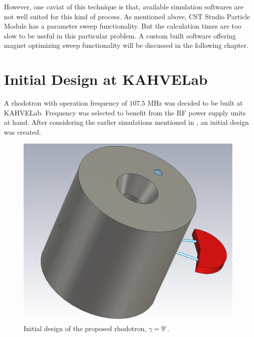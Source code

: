 \documentclass[a4paper,oneside,12pt]{report}
\numberwithin{equation}{chapter}
\begin{document}
However, one caviat of this technique is that, available simulation softwares are not well suited for this kind of process. As mentioned above, CST Studio Particle Module has a parameter sweep functionality.
But the calculation times are too slow to be useful in this particular problem. A custom built software offering magnet optimizing sweep functionality will be discussed in the following chapter.




\section{Initial Design at KAHVELab} 

A rhodotron with operation frequency of $107.5$ MHz was decided to be built at KAHVELab. 
Frequency was selected to benefit from the RF power supply units at hand.
After considering the earlier simulations mentioned in , an initial design was created.
\begin{figure}[H]
    \centering
    \includegraphics[width=.5\linewidth]{./figures/cst/cst_first_design1.png}
    \vspace{20pt}
    \caption{Initial design of the proposed rhodotron, $\gamma=9^\circ$.}
    \label{fig:initial_design}
\end{figure}
\end{document}
